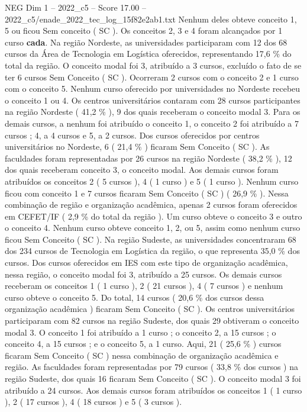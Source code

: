 \begin{textsample}{NEG Dim 1 – 2022\_c5 – Score 17.00 – 2022\_c5/enade\_2022\_tec\_log\_15f82e2ab1.txt}
Nenhum deles obteve conceito 1, 5 ou ficou Sem conceito ( SC ).
Os conceitos 2, 3 e 4 foram alcançados por 1 curso \textbf{cada}.
Na região Nordeste, as universidades participaram com 12 dos 68 cursos da Área de Tecnologia em Logística oferecidos, representando 17,6 \% do total da região.
O conceito modal foi 3, atribuído a 3 cursos, excluído o fato de se ter 6 cursos Sem Conceito ( SC ).
Ocorreram 2 cursos com o conceito 2 e 1 curso com o conceito 5.
Nenhum curso oferecido por universidades no Nordeste recebeu o conceito 1 ou 4.
Os centros universitários contaram com 28 cursos participantes na região Nordeste ( 41,2 \% ), 9 dos quais receberam o conceito modal 3.
Para os demais cursos, a nenhum foi atribuído o conceito 1, o conceito 2 foi atribuído a 7 cursos ; 4, a 4 cursos e 5, a 2 cursos.
Dos cursos oferecidos por centros universitários no Nordeste, 6 ( 21,4 \% ) ficaram Sem Conceito ( SC ).
As faculdades foram representadas por 26 cursos na região Nordeste ( 38,2 \% ), 12 dos quais receberam conceito 3, o conceito modal.
Aos demais cursos foram atribuídos os conceitos 2 ( 5 cursos ), 4 ( 1 curso ) e 5 ( 1 curso ).
Nenhum curso ficou com conceito 1 e 7 cursos ficaram Sem Conceito ( SC ) ( 26,9 \% ).
Nessa combinação de região e organização acadêmica, apenas 2 cursos foram oferecidos em CEFET/IF ( 2,9 \% do total da região ).
Um curso obteve o conceito 3 e outro o conceito 4.
Nenhum curso obteve conceito 1, 2, ou 5, assim como nenhum curso ficou Sem Conceito ( SC ).
Na região Sudeste, as universidades concentraram 68 dos 234 cursos de Tecnologia em Logística da região, o que representa 35,0 \% dos cursos.
Dos cursos oferecidos em IES com este tipo de organização acadêmica, nessa região, o conceito modal foi 3, atribuído a 25 cursos.
Os demais cursos receberam os conceitos 1 ( 1 curso ), 2 ( 21 cursos ), 4 ( 7 cursos ) e nenhum curso obteve o conceito 5.
Do total, 14 cursos ( 20,6 \% dos cursos dessa organização acadêmica ) ficaram Sem Conceito ( SC ).
Os centros universitários participaram com 82 cursos na região Sudeste, dos quais 29 obtiveram o conceito modal 3.
O conceito 1 foi atribuído a 1 curso ; o conceito 2, a 15 cursos ; o conceito 4, a 15 cursos ; e o conceito 5, a 1 curso.
Aqui, 21 ( 25,6 \% ) cursos ficaram Sem Conceito ( SC ) nessa combinação de organização acadêmica e região.
As faculdades foram representadas por 79 cursos ( 33,8 \% dos cursos ) na região Sudeste, dos quais 16 ficaram Sem Conceito ( SC ).
O conceito modal 3 foi atribuído a 24 cursos.
Aos demais cursos foram atribuídos os conceitos 1 ( 1 curso ), 2 ( 17 cursos ), 4 ( 18 cursos ) e 5 ( 3 cursos ).

\end{textsample}
